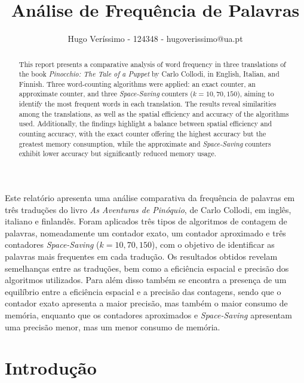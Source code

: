 \documentclass[mirror, portugues]{revdetua}
\begin{document}

\title{Análise de Frequência de Palavras}
\author{Hugo Veríssimo - 124348 - hugoverissimo@ua.pt}
\maketitle

\begin{abstract}
This report presents a comparative analysis of word frequency in three translations of the book \textit{Pinocchio: The Tale of a Puppet} by Carlo Collodi, in English, Italian, and Finnish. Three word-counting algorithms were applied: an exact counter, an approximate counter, and three \textit{Space-Saving} counters ($k = 10, 70, 150$), aiming to identify the most frequent words in each translation. The results reveal similarities among the translations, as well as the spatial efficiency and accuracy of the algorithms used. Additionally, the findings highlight a balance between spatial efficiency and counting accuracy, with the exact counter offering the highest accuracy but the greatest memory consumption, while the approximate and \textit{Space-Saving} counters exhibit lower accuracy but significantly reduced memory usage.
\end{abstract}

\begin{resumo}
Este relatório apresenta uma análise comparativa da frequência de palavras em três traduções do livro \textit{As Aventuras de Pinóquio}, de Carlo Collodi, em inglês, italiano e finlandês. Foram aplicados três tipos de algoritmos de contagem de palavras, nomeadamente um contador exato, um contador aproximado e três contadores \textit{Space-Saving} ($k = 10, 70, 150$), com o objetivo de identificar as palavras mais frequentes em cada tradução. Os resultados obtidos revelam semelhanças entre as traduções, bem como a eficiência espacial e precisão dos algoritmos utilizados. Para além disso também se encontra a presença de um equilíbrio entre a eficiência espacial e a precisão das contagens, sendo que o contador exato apresenta a maior precisão, mas também o maior consumo de memória, enquanto que os contadores aproximados e \textit{Space-Saving} apresentam uma precisão menor, mas um menor consumo de memória.
\end{resumo}

\section{Introdução}
\end{document}
